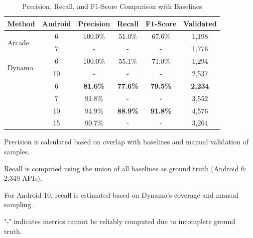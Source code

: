 
\begin{table}[t]
\centering
\caption{Precision, Recall, and F1-Score Comparison with Baselines}
\label{tab:metrics}
\begin{tabular}{lccccc}
\toprule
\textbf{Method} & \textbf{Android} & \textbf{Precision} & \textbf{Recall} & \textbf{F1-Score} & \textbf{Validated} \\
\midrule
\multirow{2}{*}{Arcade} & 6 & 100.0\% & 51.0\% & 67.6\% & 1,198 \\
                        & 7 & - & - & - & 1,776 \\
\midrule
\multirow{2}{*}{Dynamo} & 6 & 100.0\% & 55.1\% & 71.0\% & 1,294 \\
                        & 10 & - & - & - & 2,537 \\
\midrule
\textbf{\tool{}} & 6 & \textbf{81.6\%} & \textbf{77.6\%} & \textbf{79.5\%} & \textbf{2,234} \\
                 & 7 & 91.8\% & - & - & 3,552 \\
                 & 10 & 94.9\% & \textbf{88.9\%} & \textbf{91.8\%} & 4,576 \\
                 & 15 & 90.7\% & - & - & 3,264 \\

\bottomrule
\end{tabular}
\begin{tablenotes}
\small
\item Precision is calculated based on overlap with baselines and manual validation of samples.
\item Recall is computed using the union of all baselines as ground truth (Android 6: 2,349 APIs).
\item For Android 10, recall is estimated based on Dynamo's coverage and manual sampling.
\item "-" indicates metrics cannot be reliably computed due to incomplete ground truth.
\end{tablenotes}
\end{table}
